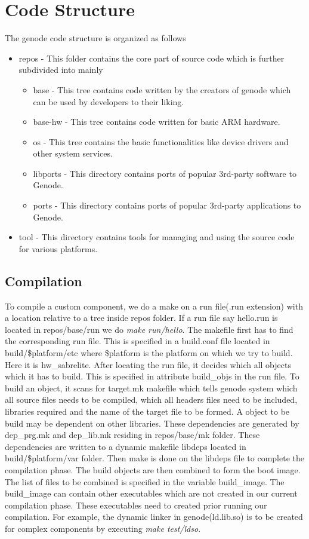 \documentclass[12pt]{article}
\theoremstyle{plain}
\begin{document}
\section*{Code Structure}
The genode code structure is organized as follows
\begin{itemize}
\item repos - This folder contains the core part of source code which is further subdivided into mainly
\begin{itemize}
\item base - This tree contains code written by the creators of genode which can be used by developers to their liking.
\item base-hw - This tree contains code written for basic ARM hardware.
\item os - This tree contains the basic functionalities like device drivers and other system services.
\item libports - This directory contains ports of popular 3rd-party software to Genode.
\item ports - This directory contains ports of popular 3rd-party applications to Genode.
\end{itemize}
\item tool - This directory contains tools for managing and using the source code for various platforms.
\end{itemize}
\subsection*{Compilation}
To compile a custom component, we do a make on a run file(.run extension) with a location relative to a tree inside repos folder. If a run file say hello.run is located in repos/base/run we do \textit{make run/hello}. The makefile first has to find the corresponding run file. This is specified in a build.conf file located in build/\$platform/etc where \$platform is the platform on which we try to build. Here it is hw\_sabrelite. After locating the run file, it decides which all objects which it has to build. This is specified in attribute build\_objs in the run file. To build an object, it scans for target.mk makefile which tells genode system which all source files needs to be compiled, which all headers files need to be included, libraries required and the name of the target file to be formed. A object to be build may be dependent on other libraries. These dependencies are generated by dep\_prg.mk and dep\_lib.mk residing in repos/base/mk folder.  These dependencies are written to a dynamic makefile libdeps located in build/\$platform/var folder. Then make is done on the libdeps file to complete the compilation phase. The build objects are then combined to form the boot image. The list of files to be combined is specified in the variable build\_image. The build\_image can contain other executables which are not created in our current compilation phase. These executables need to created prior running our compilation. For example, the dynamic linker in genode(ld.lib.so) is to be created for complex components by executing \textit{make test/ldso}.
\end{document}
